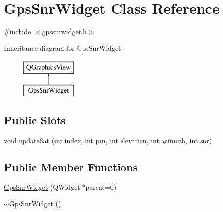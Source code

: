 \hypertarget{class_gps_snr_widget}{\section{Gps\-Snr\-Widget Class Reference}
\label{class_gps_snr_widget}
}


{\ttfamily \#include $<$gpssnrwidget.\-h$>$}

Inheritance diagram for Gps\-Snr\-Widget\-:\begin{figure}[H]
\begin{center}
\leavevmode
\includegraphics[height=2.000000cm]{class_gps_snr_widget}
\end{center}
\end{figure}
\subsection*{Public Slots}
\begin{DoxyCompactItemize}
\item 
\hyperlink{group___u_a_v_objects_plugin_ga444cf2ff3f0ecbe028adce838d373f5c}{void} \hyperlink{class_gps_snr_widget_a6dbf80e15de8677ffd302e6e7f0819b1}{update\-Sat} (\hyperlink{ioapi_8h_a787fa3cf048117ba7123753c1e74fcd6}{int} \hyperlink{glext_8h_ab47dd9958bcadea08866b42bf358e95e}{index}, \hyperlink{ioapi_8h_a787fa3cf048117ba7123753c1e74fcd6}{int} prn, \hyperlink{ioapi_8h_a787fa3cf048117ba7123753c1e74fcd6}{int} elevation, \hyperlink{ioapi_8h_a787fa3cf048117ba7123753c1e74fcd6}{int} azimuth, \hyperlink{ioapi_8h_a787fa3cf048117ba7123753c1e74fcd6}{int} snr)
\end{DoxyCompactItemize}
\subsection*{Public Member Functions}
\begin{DoxyCompactItemize}
\item 
\hyperlink{class_gps_snr_widget_a7ea7b55afc5cd80d895ea0150d16f10b}{Gps\-Snr\-Widget} (Q\-Widget $\ast$parent=0)
\item 
\hyperlink{class_gps_snr_widget_a81e2e0638608c2aaee946080fa3c5101}{$\sim$\-Gps\-Snr\-Widget} ()
\end{DoxyCompactItemize}
